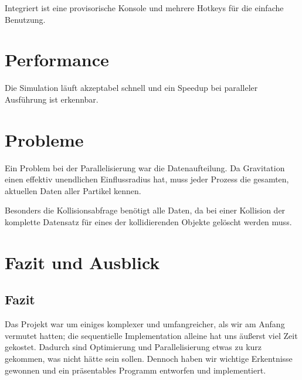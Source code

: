 Integriert ist eine provisorische Konsole und mehrere Hotkeys für die einfache Benutzung.

\section{Performance}
Die Simulation läuft akzeptabel schnell und ein Speedup bei paralleler
Ausführung ist erkennbar.

\section{Probleme}
Ein Problem bei der Parallelisierung war die Datenaufteilung. Da Gravitation einen effektiv
unendlichen Einflussradius hat, muss jeder Prozess die gesamten, aktuellen Daten aller
Partikel kennen.

Besonders die Kollisionsabfrage benötigt alle Daten, da bei einer Kollision der komplette
Datensatz für eines der kollidierenden Objekte gelöscht werden muss.

\section{Fazit und Ausblick}
\subsection{Fazit}
Das Projekt war um einiges komplexer und umfangreicher, als wir am Anfang vermutet hatten;
die sequentielle Implementation alleine hat uns äußerst viel Zeit gekostet.
Dadurch sind Optimierung und Parallelisierung etwas zu kurz gekommen, was nicht hätte sein
sollen. Dennoch haben wir wichtige Erkentnisse gewonnen und ein präsentables Programm
entworfen und implementiert.
